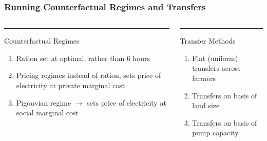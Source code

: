\documentclass[aspectratio=169]{beamer}
\begin{document}
\begin{frame}
    \frametitle{Running Counterfactual Regimes and Transfers}
    \label{counterfactuals}
    \begin{columns}[t]

        \begin{column}{0.48\textwidth}
        \color{BlueGreen}\rule{\linewidth}{4pt}
        Counterfactual Regimes
        \begin{enumerate}
            \item Ration set at optimal, rather than 6 hours
            \item Pricing regimes instead of ration, sets price of electricity at private marginal cost
            \item Pigouvian regime $\rightarrow$ sets price of electricity at social marginal cost
        \end{enumerate}
        \end{column}
        
        \begin{column}{0.48\textwidth}
        \color{RawSienna}\rule{\linewidth}{4pt}
        Transfer Methods
        \begin{enumerate}
            \item Flat (uniform) transfers across farmers
            \item Transfers on basis of land size
            \item Transfers on basis of pump capacity
        \end{enumerate}
        \end{column}
        
    \end{columns}

    \vfill
\end{frame}
\end{document}
